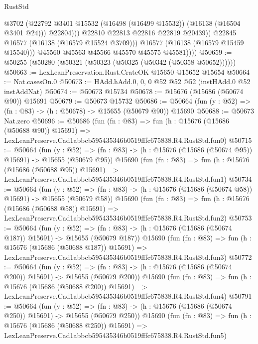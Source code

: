 \begin{lexlean}{RustStd}
\begin{coremodule}
                          @3702
                          (@22792 @3401 @15532 (@16498 (@16499 @15532)) (@16138 (@16504 @3401 @24)))
                          @22804)))
                    @22810
                    @22813
                    @22816
                    @22819
                    @20439))
                @22845
                @16577
                (@16138 (@16579 @15524 @3709)))
              @16577
              (@16138 (@16579 @15459 @15540)))
            @45560
            @45563
            @45566
            @45570
            @45575
            @45581))))
@50659 := @50255 (@50280 (@50321 (@50323 (@50325 (@50342 (@50358 @50652))))))
@50663 := LexLeanPreservation.Rust.CrateOK @15650 @15652 @15654
@50664 := Nat.casesOn.{0}
@50673 := HAdd.hAdd.{0, 0, 0} @52 @52 @52 (instHAdd.{0} @52 instAddNat)
@50674 := @50673 @15734
@50678 := @15676 (@15686 (@50674 @90)) @15691
@50679 := @50673 @15732
@50686 := @50664 (fun (y : @52) => (fn : @83) -> (h : @50678) -> @15655 (@50679 @90)) @15690
@50688 := @50673 Nat.zero
@50696 := @50686
    (fun (fn : @83) =>
    fun (h : @15676 (@15686 (@50688 @90)) @15691) =>
    LexLeanPreserve.Cad1abbcb595435346b0519fffc675838.R4.RustStd.fun0)
@50715 := @50664
    (fun (y : @52) =>
    (fn : @83) -> (h : @15676 (@15686 (@50674 @95)) @15691) -> @15655 (@50679 @95))
    @15690
    (fun (fn : @83) =>
    fun (h : @15676 (@15686 (@50688 @95)) @15691) =>
    LexLeanPreserve.Cad1abbcb595435346b0519fffc675838.R4.RustStd.fun1)
@50734 := @50664
    (fun (y : @52) =>
    (fn : @83) -> (h : @15676 (@15686 (@50674 @58)) @15691) -> @15655 (@50679 @58))
    @15690
    (fun (fn : @83) =>
    fun (h : @15676 (@15686 (@50688 @58)) @15691) =>
    LexLeanPreserve.Cad1abbcb595435346b0519fffc675838.R4.RustStd.fun2)
@50753 := @50664
    (fun (y : @52) =>
    (fn : @83) -> (h : @15676 (@15686 (@50674 @187)) @15691) -> @15655 (@50679 @187))
    @15690
    (fun (fn : @83) =>
    fun (h : @15676 (@15686 (@50688 @187)) @15691) =>
    LexLeanPreserve.Cad1abbcb595435346b0519fffc675838.R4.RustStd.fun3)
@50772 := @50664
    (fun (y : @52) =>
    (fn : @83) -> (h : @15676 (@15686 (@50674 @200)) @15691) -> @15655 (@50679 @200))
    @15690
    (fun (fn : @83) =>
    fun (h : @15676 (@15686 (@50688 @200)) @15691) =>
    LexLeanPreserve.Cad1abbcb595435346b0519fffc675838.R4.RustStd.fun4)
@50791 := @50664
    (fun (y : @52) =>
    (fn : @83) -> (h : @15676 (@15686 (@50674 @250)) @15691) -> @15655 (@50679 @250))
    @15690
    (fun (fn : @83) =>
    fun (h : @15676 (@15686 (@50688 @250)) @15691) =>
    LexLeanPreserve.Cad1abbcb595435346b0519fffc675838.R4.RustStd.fun5)

\end{coremodule}
\end{lexlean}
